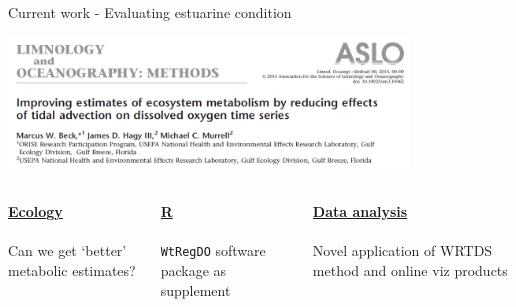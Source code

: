 \documentclass[serif]{beamer}\usepackage[]{graphicx}\usepackage[]{color}
\begin{document}
\begin{frame}[t]{Current work - Evaluating estuarine condition}
\centerline{\includegraphics[width = 0.8\textwidth]{fig/lopaper.png}} 
\vspace{0.1in}
\begin{columns}[T]
  \begin{column}{0.3\textwidth}
    \textbf{\underline{Ecology}}\\~\\
    Can we get `better' metabolic estimates?
  \end{column}
  \begin{column}{0.3\textwidth}
    \textbf{\underline{R}}\\~\\
    \texttt{WtRegDO} software package as supplement
  \end{column}
  \begin{column}{0.3\textwidth}
    \textbf{\underline{Data analysis}}\\~\\
    Novel application of WRTDS method and online viz products
  \end{column}
\end{columns}
\end{frame}
\end{document}
